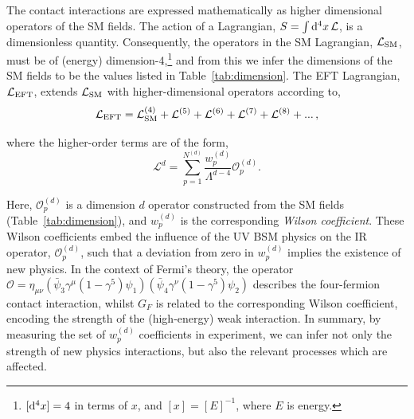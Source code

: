 The contact interactions are expressed mathematically as higher dimensional operators of the SM fields. The action of a Lagrangian, $S=\int {\rm{d}}^4x\,\mathcal{L}$, is a dimensionless quantity. Consequently, the operators in the SM Lagrangian, $\mathcal{L}_{\rm{SM}}$, must be of (energy) dimension-4,\footnote{$[{\rm{d}}^4x]=4$ in terms of $x$, and $[x]=[E]^{-1}$, where $E$ is energy.} and from this we infer the dimensions of the SM fields to be the values listed in Table~\ref{tab:dimension}. The EFT Lagrangian, $\mathcal{L}_{\rm{EFT}}$, extends $\mathcal{L}_{\rm{SM}}$ with higher-dimensional operators according to,
\begin{equation}\label{eq:eft_expansion}
    \mathcal{L}_{\rm{EFT}} = \mathcal{L}^{\rm{(4)}}_{\rm{SM}} + \mathcal{L}^{\rm{(5)}} + \mathcal{L}^{\rm{(6)}} + \mathcal{L}^{\rm{(7)}} + \mathcal{L}^{\rm{(8)}} + {\rm{...}} \, ,
\end{equation}

\noindent
where the higher-order terms are of the form,
\begin{equation}\label{eq:eft_term}
    \mathcal{L}^{d} = \sum^{N^{(d)}}_{p=1} \frac{w^{(d)}_p}{\Lambda^{{d}-4}} \mathcal{O}^{(d)}_p.
\end{equation}

\noindent
Here, $\mathcal{O}^{(d)}_p$ is a dimension $d$ operator constructed from the SM fields (Table~\ref{tab:dimension}), and $w^{(d)}_p$ is the corresponding \textit{Wilson coefficient}. These Wilson coefficients embed the influence of the UV BSM physics on the IR operator, $\mathcal{O}^{(d)}_p$, such that a deviation from zero in $w^{(d)}_p$ implies the existence of new physics. In the context of Fermi's theory, the operator ${\mathcal{O}=\eta_{\mu\nu} (\bar{\psi}_3 \gamma^\mu(1-\gamma^5) \psi_1)(\bar{\psi}_4 \gamma^\nu(1-\gamma^5) \psi_2)}$ describes the four-fermion contact interaction, whilst $G_F$ is related to the corresponding Wilson coefficient, encoding the strength of the (high-energy) weak interaction. In summary, by measuring the set of $w^{(d)}_p$ coefficients in experiment, we can infer not only the strength of new physics interactions, but also the relevant processes which are affected.

